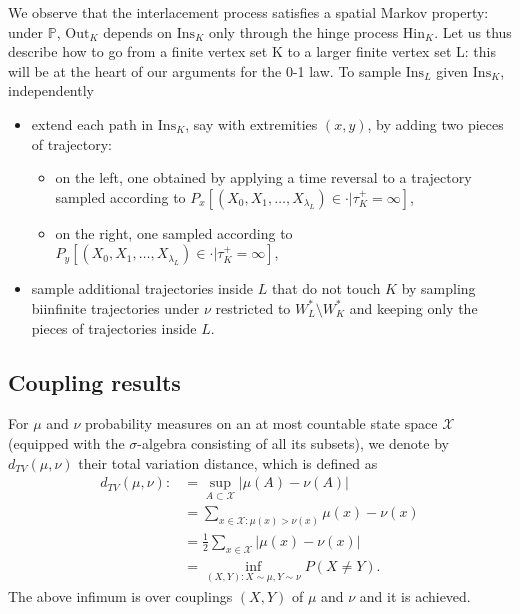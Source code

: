 \documentclass[12pt,a4paper]{article}
\newcommand{\1}[1]{{\mathbf 1}{\{#1\}}}
\newcommand{\8}{{\infty}}
\newcommand{\p}{\mathbb{P}}
\newcommand{\Out}{\mathrm{Out}}
\newcommand{\In}{\mathrm{Ins}}
\newcommand{\Hin}{\mathrm{Hin}}
\begin{document}
\smallskip


We observe that the interlacement process satisfies a spatial Markov property: under $\p$, $\Out_K$ depends on $\In_K$ only through the hinge process $\Hin_K$. Let us thus describe how to go from a finite vertex set K to a larger finite vertex set L: this will be at the heart of our arguments for the 0-1 law.
To sample $\In_L$ given $\In_K$, independently
\begin{itemize}
  \item extend each path in $\In_K$, say with extremities $(x,y)$, by adding two pieces of trajectory:
\begin{itemize}
  \item on the left, one obtained by applying a time reversal to a trajectory sampled according to $P_x[ (X_0, X_1, \dots, X_{\lambda_{L}})\in \cdot |  \tau_{K}^+=\infty]$,
  \item on the right, one sampled according to $P_y[ (X_0, X_1, \dots, X_{\lambda_{L}})\in \cdot |  \tau_{K}^+=\infty]$,
\end{itemize}
\item sample additional trajectories inside $L$ that do not touch $K$ by sampling biinfinite trajectories under $\nu$ restricted to $W_L^*\setminus W_K^*$ and keeping only the pieces of trajectories inside $L$.
\end{itemize}



\subsection{Coupling results}


For $\mu$ and $\nu$ probability measures on an at most countable state space $\mathcal{X}$ (equipped with the $\sigma$-algebra consisting of all its subsets), we denote by $d_{TV}(\mu, \nu)$ their total variation distance, which is defined as
\begin{equation}\label{eq:def_dTV}
  \begin{aligned}
    d_{TV}(\mu, \nu) : & = \sup_{A\subset \mathcal{X}} |\mu(A)- \nu(A)| \\
    & = \sum_{x\in \mathcal{X} : \mu(x)>\nu(x) } \mu(x)- \nu(x) \\
    & = \frac{1}{2} \sum_{x\in \mathcal{X} } |\mu(x)- \nu(x) |\\
    & = \inf_{(X, Y) : X\sim \mu, Y\sim \nu} P(X \neq Y) .
   \end{aligned}
\end{equation}
The above infimum is over couplings $(X, Y)$ of $\mu$ and $\nu$ and it is achieved.
\end{document}
